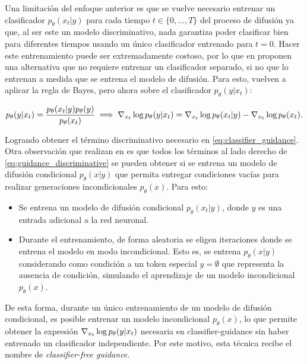 Una limitación del enfoque anterior es que se vuelve necesario entrenar un clasificador $p_\theta(x_t|y)$ para cada tiempo $t\in\{0,\ldots,T\}$ del proceso de difusión ya que, al ser este un modelo discriminativo, nada garantiza poder clasificar bien para diferentes tiempos usando un único clasificador entrenado para $t=0$. Hacer este entrenamiento puede ser extremadamente costoso, por lo que en \cite{ho2022classifierfreediffusionguidance} proponen una alternativa que no requiere entrenar un clasificador separado, si no que lo entrenan a medida que se entrena el modelo de difusión. Para esto, vuelven a aplicar la regla de Bayes, pero ahora sobre el clasificador $p_\theta(y|x_t)$:

\begin{equation}
    \label{eq:guidance_discriminative}
    p_\theta(y|x_t) = \frac{p_\theta(x_t|y)p_\theta(y)}{p_\theta(x_t)}
    \implies
    \nabla_{x_t} \log p_\theta(y|x_t) = \nabla_{x_t} \log p_\theta(x_t|y) - \nabla_{x_t} \log p_\theta(x_t).
\end{equation}

Logrando obtener el término discriminativo necesario en \eqref{eq:classifier_guidance}. Otra observación que realizan en \cite{ho2022classifierfreediffusionguidance} es que todos los términos al lado derecho de \eqref{eq:guidance_discriminative} se pueden obtener si se entrena un modelo de difusión condicional $p_\theta(x|y)$ que permita entregar condiciones vacías para realizar generaciones incondicionales $p_\theta(x)$. Para esto:

\begin{itemize}
    \item Se entrena un modelo de difusión condicional $p_\theta(x_t|y)$, donde $y$ es una entrada adicional a la red neuronal.
    \item Durante el entrenamiento, de forma aleatoria se eligen iteraciones donde se entrena el modelo en modo incondicional. Esto es, se entrena $p_\theta(x|y)$ considerando como condición a un token especial $y=\emptyset$ que representa la ausencia de condición, simulando el aprendizaje de un modelo incondicional $p_\theta(x)$.
\end{itemize}

De esta forma, durante un único entrenamiento de un modelo de difusión condicional, es posible entrenar un modelo incondicional $p_\theta(x)$, lo que permite obtener la expresión $\nabla_{x_t} \log p_\theta(y|x_t)$ necesaria en classifier-guidance sin haber entrenado un clasificador independiente. Por este motivo, esta técnica recibe el nombre de \textit{classifier-free guidance}.

